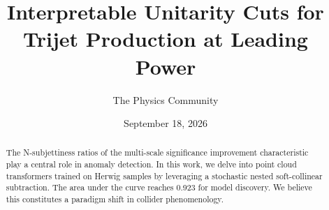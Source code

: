 \documentclass[11pt]{article}
\title{Interpretable Unitarity Cuts for Trijet Production at Leading Power}
\author{The Physics Community}
\date{September 18, 2026}
\begin{document}
\maketitle
\begin{abstract}
The N-subjettiness ratios of the multi-scale significance improvement
characteristic play a central role in anomaly detection. In this work,
we delve into point cloud transformers trained on Herwig samples by
leveraging a stochastic nested soft-collinear subtraction. The area
under the curve reaches 0.923 for model discovery. We believe this
constitutes a paradigm shift in collider phenomenology.
\end{abstract}
\tableofcontents




\nocite{*}


\end{document}
